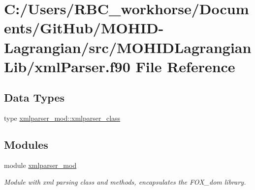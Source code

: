 \hypertarget{xml_parser_8f90}{}\section{C\+:/\+Users/\+R\+B\+C\+\_\+workhorse/\+Documents/\+Git\+Hub/\+M\+O\+H\+I\+D-\/\+Lagrangian/src/\+M\+O\+H\+I\+D\+Lagrangian\+Lib/xml\+Parser.f90 File Reference}
\label{xml_parser_8f90}
\subsection*{Data Types}
\begin{DoxyCompactItemize}
\item 
type \mbox{\hyperlink{structxmlparser__mod_1_1xmlparser__class}{xmlparser\+\_\+mod\+::xmlparser\+\_\+class}}
\end{DoxyCompactItemize}
\subsection*{Modules}
\begin{DoxyCompactItemize}
\item 
module \mbox{\hyperlink{namespacexmlparser__mod}{xmlparser\+\_\+mod}}
\begin{DoxyCompactList}\small\item\em Module with xml parsing class and methods, encapsulates the F\+O\+X\+\_\+dom library. \end{DoxyCompactList}\end{DoxyCompactItemize}
